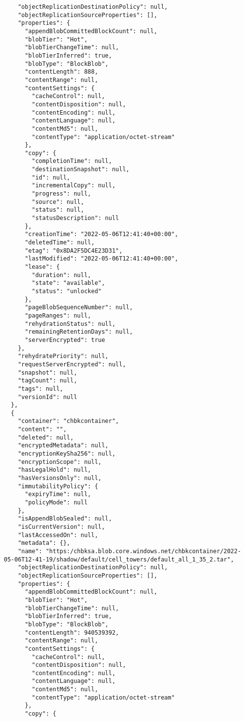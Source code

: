 \begin{verbatim}
    "objectReplicationDestinationPolicy": null,
    "objectReplicationSourceProperties": [],
    "properties": {
      "appendBlobCommittedBlockCount": null,
      "blobTier": "Hot",
      "blobTierChangeTime": null,
      "blobTierInferred": true,
      "blobType": "BlockBlob",
      "contentLength": 888,
      "contentRange": null,
      "contentSettings": {
        "cacheControl": null,
        "contentDisposition": null,
        "contentEncoding": null,
        "contentLanguage": null,
        "contentMd5": null,
        "contentType": "application/octet-stream"
      },
      "copy": {
        "completionTime": null,
        "destinationSnapshot": null,
        "id": null,
        "incrementalCopy": null,
        "progress": null,
        "source": null,
        "status": null,
        "statusDescription": null
      },
      "creationTime": "2022-05-06T12:41:40+00:00",
      "deletedTime": null,
      "etag": "0x8DA2F5DC4E23D31",
      "lastModified": "2022-05-06T12:41:40+00:00",
      "lease": {
        "duration": null,
        "state": "available",
        "status": "unlocked"
      },
      "pageBlobSequenceNumber": null,
      "pageRanges": null,
      "rehydrationStatus": null,
      "remainingRetentionDays": null,
      "serverEncrypted": true
    },
    "rehydratePriority": null,
    "requestServerEncrypted": null,
    "snapshot": null,
    "tagCount": null,
    "tags": null,
    "versionId": null
  },
  {
    "container": "chbkcontainer",
    "content": "",
    "deleted": null,
    "encryptedMetadata": null,
    "encryptionKeySha256": null,
    "encryptionScope": null,
    "hasLegalHold": null,
    "hasVersionsOnly": null,
    "immutabilityPolicy": {
      "expiryTime": null,
      "policyMode": null
    },
    "isAppendBlobSealed": null,
    "isCurrentVersion": null,
    "lastAccessedOn": null,
    "metadata": {},
    "name": "https:/chbksa.blob.core.windows.net/chbkcontainer/2022-05-06T12-41-19/shadow/default/cell_towers/default_all_1_35_2.tar",
    "objectReplicationDestinationPolicy": null,
    "objectReplicationSourceProperties": [],
    "properties": {
      "appendBlobCommittedBlockCount": null,
      "blobTier": "Hot",
      "blobTierChangeTime": null,
      "blobTierInferred": true,
      "blobType": "BlockBlob",
      "contentLength": 940539392,
      "contentRange": null,
      "contentSettings": {
        "cacheControl": null,
        "contentDisposition": null,
        "contentEncoding": null,
        "contentLanguage": null,
        "contentMd5": null,
        "contentType": "application/octet-stream"
      },
      "copy": {

\end{verbatim}
